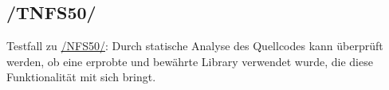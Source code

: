 \subsection*{/TNFS50/}
\label{/TNFS50/} Testfall zu \hyperref[/NFS50/]{/NFS50/}: Durch \gls{statische Analyse} des \Gls{Quellcode}s kann überprüft werden, ob eine erprobte und bewährte \Gls{Library} verwendet wurde,
die diese Funktionalität mit sich bringt.